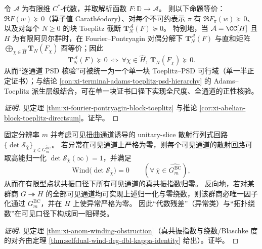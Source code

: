 \begin{conclusion}\label{con:xi-terminal-abelian-block-toeplitz-diagonalization}
令 \(\mathcal{A}\) 为有限维 \(C^\ast\)-代数，并取解析函数 \(F:\mathbb{D}\to\mathcal{A}\)。
则以下命题等价：\(\Re F(w)\succeq 0\)（算子值 Carath\'eodory）、对每个不可约表示 \(\pi\) 有 \(\Re F_\pi(w)\succeq 0\)、以及对每个 \(N\ge 0\) 的块 Toeplitz 截断 \(\mathbf{T}^{\mathcal{A}}_N(F)\succeq 0\)。
特别地，当 \(\mathcal{A}=\CC[H]\) 且 \(H\) 为有限阿贝尔群时，在 Fourier--Pontryagin 对偶分解下 \(\mathbf{T}^{\mathcal{A}}_N(F)\) 与直和矩阵 \(\bigoplus_{\chi\in\widehat H}\mathbf{T}_N(F_\chi)\) 酉等价；因此
\[
\mathbf{T}^{\mathcal{A}}_N(F)\succeq 0\ \Longleftrightarrow\ \forall\chi\in\widehat H,\ \mathbf{T}_N(F_\chi)\succeq 0.
\]
从而“逐通道 PSD 核验”可被统一为一个单一块 Toeplitz--PSD 可行域（单一半正定证书）；与结论 \ref{con:xi-terminal-adams-toeplitz-psd-hierarchy} 的 Adams--Toeplitz 派生层级结合，可在单一块证书口径下实现全尺度、全通道的正性核验。
\end{conclusion}
\begin{proof}[证明]
见定理 \ref{thm:xi-fourier-pontryagin-block-toeplitz} 与推论 \ref{cor:xi-abelian-block-toeplitz-directsum}。证毕。
\end{proof}

\begin{conclusion}\label{con:xi-terminal-anom-winding-obstruction-equivalence}
固定分辨率 \(m\) 并考虑可见扭曲通道诱导的 unitary-slice 散射行列式回路
\(\{\det\mathcal S_{\overline\chi}\}_{\overline\chi\in\widehat{G^{\mathrm{BC}}_m}}\)。
若异常在可见通道上严格为零，则每个可见通道的散射回路可取高能归一化
\(\det\mathcal S_{\overline\chi}(\infty)=1\)，并满足
\[
\mathrm{Wind}\bigl(\det\mathcal S_{\overline\chi}\bigr)=0
\qquad(\forall\,\overline\chi\in\widehat{G^{\mathrm{BC}}_m}),
\]
从而在有限型点状共振口径下所有可见通道的真共振指数归零。
反向地，若对某群商 \(G\twoheadrightarrow H\) 的全部可见通道均可实现上述归一化与零绕数，则该群商必唯一因子化通过 \(G^{\mathrm{BC}}_m\)，并在 \(H\) 上使异常严格为零。
因此“代数残差”（异常类）与“拓扑绕数”在可见口径下构成同一阻碍类。
\end{conclusion}
\begin{proof}[证明]
见定理 \ref{thm:xi-anom-winding-obstruction}（真共振指数与绕数/Blaschke 度的对齐由定理 \ref{thm:selfdual-wind-deg-dbl-kappa-identity} 给出）。证毕。
\end{proof}

